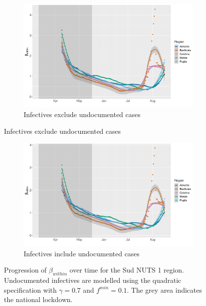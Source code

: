\documentclass[12pt]{article}
\begin{document}
\begin{appendices}
		\begin{figure}[H]
    	    \centering
    	    \begin{subfigure}{\textwidth}
    	      \centering
    	      \includegraphics[width=0.94\linewidth]{output/model_within_lag14_betawithin_Sud_rollingwindow30.pdf}
    	      \caption{Infectives exclude undocumented cases}
    	      \label{fig:beta_within_over_time_sud_lowsample_regular}
    	    \end{subfigure}\newline
        \end{figure}
        \begin{figure}[H]\ContinuedFloat
    	    \begin{subfigure}{\textwidth}
    	      \centering
    	      \includegraphics[width=0.94\linewidth]{output/model_within_lag14_betawithin_Sud_UndocQuadratic_rollingwindow30.pdf}
    	      \caption{Infectives include undocumented cases}
    	      \label{fig:beta_within_over_time_sud_lowsample_regular_undoc}
    	    \end{subfigure}
    	    \caption{Progression of $\beta_{within}$ over time for the Sud NUTS 1 region. Undocumented infectives are modelled using the quadratic specification with $\gamma = 0.7$ and $f^{min}=0.1$. The grey area indicates the national lockdown.}
    	    \label{fig:beta_within_over_time_sud_lowsample}
	    \end{figure}
		

\end{appendices}
\end{document}
